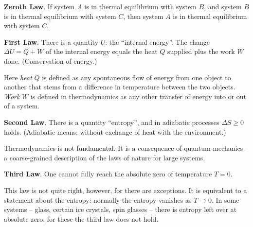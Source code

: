 \begin{center}
\parbox[c][5cm][c]{14cm}{\begin{tcolorbox}[colback=banana,arc=0cm,frame hidden,enhanced]{\textbf{Zeroth Law}. If system $A$ is in thermal equilibrium with system $B$, and system $B$ is in thermal equilibrium with system $C$, then system $A$ is in thermal equilibrium with system $C$.}\end{tcolorbox}}
\end{center}
\begin{center}
\parbox[c][5cm][c]{14cm}{\begin{tcolorbox}[colback=banana,arc=0cm,frame hidden,enhanced]{\textbf{First Law}. There is a quantity $U$: the ``internal energy''. The change $\Delta U = Q+W$ of the internal energy equals the heat $Q$ supplied plus the work $W$ done. (Conservation of energy.)}\end{tcolorbox}}
\end{center}
Here \emph{heat} $Q$ is defined as any spontaneous flow of energy from one object to another that stems from a difference in temperature between the two objects. \emph{Work} $W$ is defined in thermodynamics as any other transfer of energy into or out of a system. 
\begin{center}
\parbox[c][5cm][c]{14cm}{\begin{tcolorbox}[colback=banana,arc=0cm,frame hidden,enhanced]{\textbf{Second Law}. There is a quantity ``entropy'', and in adiabatic processes $\Delta S \ge 0$ holds. (Adiabatic means: without exchange of heat with the environment.)}\end{tcolorbox}}
\end{center}
\begin{merksatz}
	Thermodynamics is not fundamental. It is a consequence of quantum mechanics -- a coarse-grained description of the laws of nature for large systems.
\end{merksatz}
\begin{center}
\parbox[c][5cm][c]{14cm}{\begin{tcolorbox}[colback=banana,arc=0cm,frame hidden,enhanced]{\textbf{Third Law}. One cannot fully reach the absolute zero of temperature $T=0$.}\end{tcolorbox}}
\end{center}

This law is not quite right, however, for there are exceptions. It is equivalent to a statement about the entropy: normally the entropy vanishes as $T\to 0$. In some systems -- glass, certain ice crystals, spin glasses -- there is entropy left over at absolute zero; for these the third law does not hold.
 


